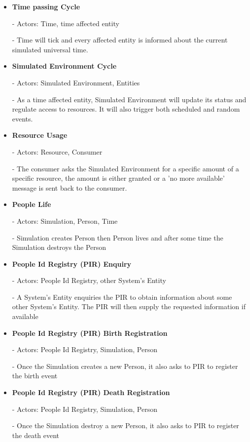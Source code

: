 \begin{itemize}
  \item \textbf{Time passing Cycle}  
	
	- Actors: Time, time affected entity

	- Time will tick and every affected entity is informed about the current simulated universal time.

  \item \textbf{Simulated Environment Cycle}

	- Actors: Simulated Environment, Entities

	- As a time affected entity, Simulated Environment will update its status and regulate access to resources. It will also trigger both scheduled and random events.

  \item \textbf{Resource Usage}

	- Actors: Resource, Consumer

	- The consumer asks the Simulated Environment for a specific amount of a specific resource, the amount is either granted or a 'no more available' message is sent back to the consumer.

  \item \textbf{People Life} 

	- Actors: Simulation, Person, Time

	- Simulation creates Person then Person lives and after some time the Simulation destroys the Person

  \item \textbf{People Id Registry (PIR) Enquiry}

	- Actors: People Id Registry, other System's Entity

	- A System's Entity enquiries the PIR to obtain information about some other System's Entity. The PIR will then supply the requested information  if available

  \item \textbf{People Id Registry (PIR) Birth Registration}

	- Actors: People Id Registry, Simulation, Person

	- Once the Simulation creates a new Person, it also asks to PIR to register the birth event

  \item \textbf{People Id Registry (PIR) Death Registration}

	- Actors: People Id Registry, Simulation, Person

	- Once the Simulation destroy a new Person, it also asks to PIR to register the death event


\end{itemize}
